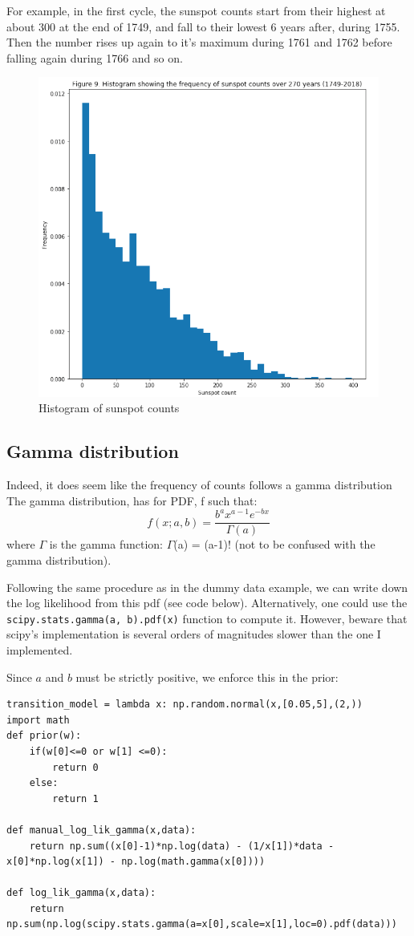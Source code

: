For example, in the first cycle, the sunspot counts start from their highest at about 300 at the end of 1749, and fall to their lowest 6 years after, during 1755. Then the number rises up again to it's maximum during 1761 and 1762 before falling again during 1766 and so on.

\begin{figure}[h]
    \centering
\includegraphics[width=.6\textwidth]{pic/p05c09-snip10}
    \caption{Histogram of sunspot counts}
    \label{fig:p05c09-snip10}
\end{figure}

\FloatBarrier
\subsection{Gamma distribution}
Indeed, it does seem like the frequency of counts follows a gamma distribution
The gamma distribution, has for PDF, f such that:
\begin{equation}f(x ; a, b)=\frac{b^{a} x^{a-1} e^{-b x}}{\Gamma(a)}\end{equation}
where  $\Gamma$ is the gamma function:  $\Gamma$(a) = (a-1)! (not to be confused with the gamma distribution).

Following the same procedure as in the dummy data example, we can write down the log likelihood from this pdf (see code below). Alternatively, one could use the \lstinline{scipy.stats.gamma(a, b).pdf(x)} function to compute it. However, beware that scipy's implementation is several orders of magnitudes slower than the one I implemented.

Since $a$ and $b$ must be strictly positive, we enforce this in the prior:

\begin{lstlisting}
transition_model = lambda x: np.random.normal(x,[0.05,5],(2,))
import math
def prior(w):
    if(w[0]<=0 or w[1] <=0):
        return 0
    else:
        return 1
    
def manual_log_lik_gamma(x,data):
    return np.sum((x[0]-1)*np.log(data) - (1/x[1])*data - x[0]*np.log(x[1]) - np.log(math.gamma(x[0])))
    
def log_lik_gamma(x,data):
    return np.sum(np.log(scipy.stats.gamma(a=x[0],scale=x[1],loc=0).pdf(data)))    
\end{lstlisting}

